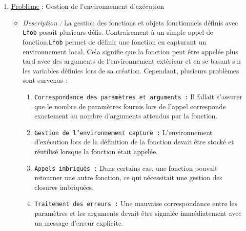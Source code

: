 \documentclass{article}
\begin{document}
\begin{enumerate}
    \item \underline{Problème} : Gestion de l'environnement d’exécution
        \begin{itemize}
            \item \textit{Description :} La gestion des fonctions et objets fonctionnels définis avec \texttt{Lfob} posait 
                                         plusieurs défis. Contrairement à un simple appel de fonction,\texttt{Lfob} permet 
                                         de définir une fonction en capturant un environnement local. 
                                         Cela signifie que la fonction peut être appelée plus tard avec des arguments
                                         de l'environnement extérieur et en se basant sur les variables définies lors 
                                         de sa création. Cependant, plusieurs problèmes sont survenus :
                                        \begin{enumerate}
                                            \item \texttt{Correspondance des paramètres et arguments :} Il fallait 
                                                          s'assurer que le nombre de paramètres fournis lors de l’appel 
                                                          corresponde exactement au nombre d'arguments attendus par la fonction.
                                            \item \texttt{Gestion de l’environnement capturé :} L’environnement d’exécution 
                                                          lors de la définition de la fonction devait être stocké et réutilisé 
                                                          lorsque la fonction était appelée.
                                            \item \texttt{Appels imbriqués :} Dans certains cas, une fonction pouvait retourner 
                                                                              une autre fonction, ce qui nécessitait une gestion 
                                                                              des closures imbriquées.
                                            \item \texttt{Traitement des erreurs :} Une mauvaise correspondance entre les 
                                                          paramètres et les arguments devait être signalée immédiatement 
                                                          avec un message d'erreur explicite.
                                        \end{enumerate}

\end{itemize}
\end{enumerate}
\end{document}
